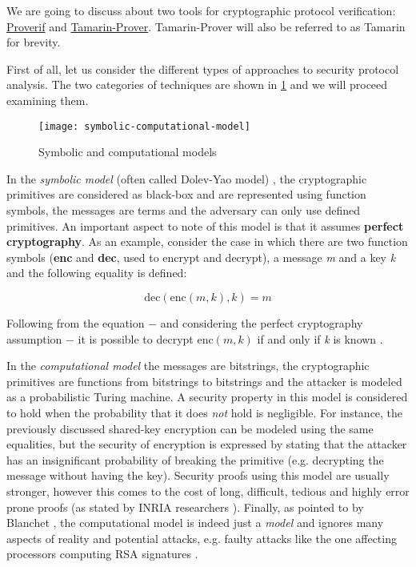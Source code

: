 
We are going to discuss about two tools for cryptographic protocol verification: \href{https://prosecco.gforge.inria.fr/personal/bblanche/proverif/}{Proverif} and \href{https://tamarin-prover.github.io/}{Tamarin-Prover}. Tamarin-Prover will also be referred to as Tamarin for brevity.

First of all, let us consider the different types of approaches to security protocol analysis. The two categories of techniques are shown in \cref{fig:symbolic-computational-model} and we will proceed examining them.

\begin{figure}[t]
    \texttt{[image: symbolic-computational-model]}
    \centering
    \caption{Symbolic and computational models}
    \label{fig:symbolic-computational-model}
\end{figure}

In the \textit{symbolic model} (often called Dolev-Yao model) \cite{Dolev-Yao}, the cryptographic primitives are considered as black-box and are represented using function symbols, the messages are terms and the adversary can only use defined primitives. An important aspect to note of this model is that it assumes \textbf{perfect cryptography}. As an example, consider the case in which there are two function symbols (\textbf{enc} and \textbf{dec}, used to encrypt and decrypt), a message \textit{m} and a key \textit{k} and the following equality is defined:

\begin{equation}
\mbox{dec}\left(\mbox{enc}\left(m, k\right), k\right) = m
\end{equation}

Following from the equation $-$ and considering the perfect cryptography assumption $-$ it is possible to decrypt $\mbox{enc}\left(m, k\right)$ if and only if \textit{k} is known \cite{SymbolicComputationalBlanchet}.


In the \textit{computational model} the messages are bitstrings, the cryptographic primitives are functions from bitstrings to bitstrings and the attacker is modeled as a probabilistic Turing machine.
A security property in this model is considered to hold when the probability that it does \textit{not} hold is negligible. For instance, the previously discussed shared-key encryption can be modeled using the same equalities, but the security of encryption is expressed by stating that the attacker has an insignificant probability of breaking the primitive (e.g. decrypting the message without having the key). Security proofs using this model are usually stronger, however this comes to the cost of long, difficult, tedious and highly error prone proofs (as stated by INRIA researchers \cite{ComputationalAnalysisCryptoSystemsINRIA}). Finally, as pointed to by Blanchet \cite{SymbolicComputationalBlanchet}, the computational model is indeed just a \textit{model} and ignores many aspects of reality and potential attacks, e.g. faulty attacks like the one affecting processors computing RSA signatures \cite{RSAFaultAttack}. 

